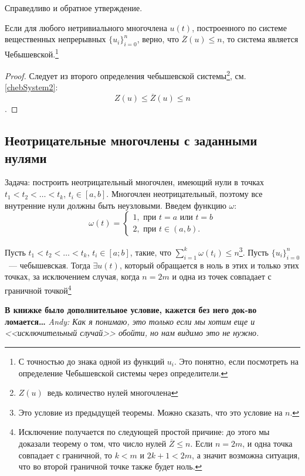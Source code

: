 Справедливо и обратное утверждение.

\begin{thm}
    Если для любого нетривиального многочлена $u(t)$, построенного по системе вещественных непрерывных $\{u_i\}_{i = 0}^n$,
    верно, что $\overline{Z}(u) \leq n$, то система является Чебышевской.\footnote{С точностью до знака одной из функций $u_i$.
    Это понятно, если посмотреть на определение Чебышевской системы через определители.}
\end{thm}
\begin{proof}
Следует из второго определения чебышевской системы\footnote{$Z(u)$ ведь количество нулей многочлена}, см. \ref{chebSystem2}:
$$Z(u) \leq \overline{Z}(u) \leq n$$.
\end{proof}

\subsection{Неотрицательные многочлены с заданными нулями}
Задача: построить неотрицательный многочлен, имеющий нули в точках $t_1 < t_2 < … < t_k$, $t_i \in [a, b]$. Многочлен неотрицательный, поэтому все внутренние нули должны быть неузловыми. Введем функцию $\omega$:
$$ \omega(t) = \begin{cases}
    1, \text{ при }t = a \text{ или }t = b\\
    2, \text{ при }t \in (a, b).
\end{cases}
$$
\begin{thm}
    Пусть $t_1 < t_2 <  … < t_k$, $t_i \in [a; b]$, такие, что $\sum \limits_{i=1}^{k} \omega(t_i) \leq n$\footnote{Это условие из предыдущей теоремы.
    Можно сказать, что это условие на $n$.}. Пусть $\{u_i\}_{i=0}^{n}$ — чебышевская. Тогда $\exists u(t)$, который обращается в ноль в этих и только этих точках, за исключением случая, когда $n=2m$ и одна из точек совпадает с граничной точкой\footnote{Исключение получается по следующей простой причине: до этого мы доказали теорему о том, что число нулей $\overline{Z} \leq n$. Если $n=2m$, и одна точка совпадает с граничной, то $k < m$ и $2k+1 < 2m$, а значит возможна ситуация, что во второй граничной точке также будет ноль.}
\end{thm}

\textbf{В книжке было дополнительное условие, кажется без него док-во ломается…}
\textit{Andy: Как я понимаю, это только если мы хотим еще и <<исключительный случай>> обойти, но нам видимо это не нужно.}

